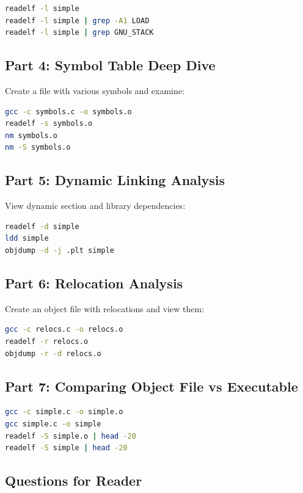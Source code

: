 \begin{lstlisting}[language=bash]
readelf -l simple
readelf -l simple | grep -A1 LOAD
readelf -l simple | grep GNU_STACK
\end{lstlisting}

\subsection{Part 4: Symbol Table Deep Dive}

Create a file with various symbols and examine:

\begin{lstlisting}[language=bash]
gcc -c symbols.c -o symbols.o
readelf -s symbols.o
nm symbols.o
nm -S symbols.o
\end{lstlisting}

\subsection{Part 5: Dynamic Linking Analysis}

View dynamic section and library dependencies:

\begin{lstlisting}[language=bash]
readelf -d simple
ldd simple
objdump -d -j .plt simple
\end{lstlisting}

\subsection{Part 6: Relocation Analysis}

Create an object file with relocations and view them:

\begin{lstlisting}[language=bash]
gcc -c relocs.c -o relocs.o
readelf -r relocs.o
objdump -r -d relocs.o
\end{lstlisting}

\subsection{Part 7: Comparing Object File vs Executable}

\begin{lstlisting}[language=bash]
gcc -c simple.c -o simple.o
gcc simple.c -o simple
readelf -S simple.o | head -20
readelf -S simple | head -20
\end{lstlisting}

\subsection{Questions for Reader}

